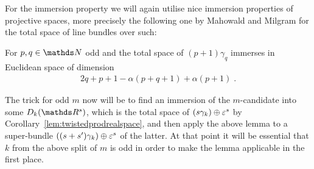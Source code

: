 For the immersion property we will again utilise nice immersion
properties of projective spaces, more precisely the following one by
Mahowald and Milgram for the total space of line bundles over such:
\begin{Lem}
  \label{lem:immersionuniversalbdl}
  For $p,q\in\Nat$ odd and the total space of $(p+1)\gamma_q$ immerses
  in Euclidean space of dimension
  \begin{gather*}
    2q+p+1-\alpha(p+q+1)+\alpha(p+1)
    \;.
  \end{gather*}
\end{Lem}
The trick for odd $m$ now will be to find an immersion of the
$m$-candidate into some $\Twistedprod{k}{\R^{s}}$, which is
the total space of $(s\gamma_k)\oplus\varepsilon^s$
by Corollary~\ref{lem:twistedprodrealspace}, and then apply the above
lemma to a super-bundle $((s+s')\gamma_k)\oplus\varepsilon^s$ of
the latter.
At that point it will be essential that $k$ from the above split of
$m$ is odd in order to make the lemma applicable in the first
place.

